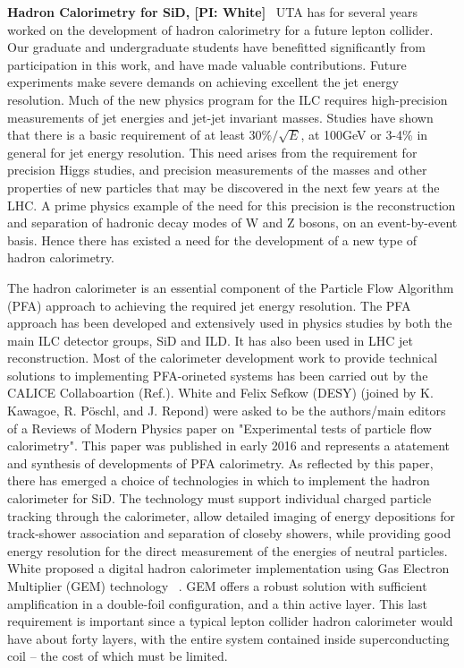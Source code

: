 
\textbf{Hadron Calorimetry for SiD, [PI: White]} \
UTA has for several years worked on the development of hadron calorimetry for a future lepton collider.
Our graduate and undergraduate students have benefitted significantly from participation in this work,
and have made valuable contributions.
Future experiments make severe demands on achieving excellent the jet energy resolution.
Much of the new physics program for the ILC requires high-precision measurements of jet
energies and jet-jet invariant masses.  Studies have shown that there is a basic requirement of at least $30\%/\sqrt{E}$,
at 100GeV or 3-4\% in general for jet energy resolution. 
This need arises from the requirement for precision Higgs studies, and precision measurements
of the masses and other properties of new particles that may be discovered in the next few years at the LHC.
A prime physics example of the need for this precision is the reconstruction and 
separation of hadronic decay modes of W and Z bosons, on an event-by-event basis. 
Hence there has existed a need for the development of a new type of hadron calorimetry.

The hadron calorimeter is an essential component of the Particle Flow Algorithm (PFA) approach to achieving the required
jet energy resolution. The PFA approach has been developed and extensively used in physics studies by both the 
main ILC detector groups, SiD and ILD. It has also been used in LHC jet reconstruction. Most of the calorimeter 
development work to provide technical solutions to implementing PFA-orineted systems has been carried out by the 
CALICE Collaboartion (Ref.). White and Felix Sefkow (DESY) (joined by K. Kawagoe, R. Pöschl, and J. Repond) were 
asked to be the authors/main editors of a Reviews of Modern Physics paper on "Experimental tests of particle flow calorimetry".
This paper was published \cite{RMPCALICE} in early 2016 and represents a atatement and synthesis of developments of PFA calorimetry.
As reflected by this paper, there has emerged a choice of technologies in which to implement the hadron calorimeter for SiD.
The technology must support individual charged particle tracking through the calorimeter, allow detailed imaging of energy 
depositions for track-shower association and separation of closeby showers, while providing good energy resolution for the
direct measurement of the energies of neutral particles.
White proposed \cite{GEMDHCAL} a digital hadron calorimeter implementation using Gas Electron Multiplier (GEM) technology ~\cite{Sauli}.
GEM offers a robust solution with sufficient amplification in a double-foil configuration, and a thin active layer. 
This last requirement is important since a typical lepton collider hadron calorimeter would have about forty layers, with the 
entire system contained inside superconducting coil -- the cost of which must be limited.

